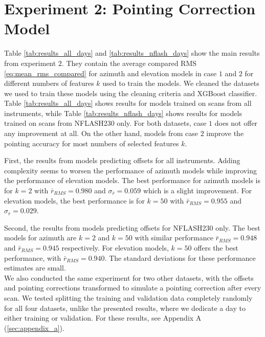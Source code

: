 \section{Experiment 2: Pointing Correction Model}
Table \ref{tab:results_all_days} and \ref{tab:results_nflash_days} show the main results from experiment $2$.
They contain the average compared RMS \eqref{eq:mean_rms_compared} for azimuth and elevation models in case $1$ and $2$ for different numbers of features $k$ used to train the models.
We cleaned the datasets we used to train these models using the cleaning criteria and XGBoost classifier.
Table \ref{tab:results_all_days} shows results for models trained on scans from all instruments, while Table \ref{tab:results_nflash_days} shows results for models
trained on scans from NFLASH230 only. For both datasets, case $1$ does not offer any improvement at all.
On the other hand, models from case $2$ improve the pointing accuracy for most numbers of selected features $k$.

First, the results from models predicting offsets for all instruments.
Adding complexity seems to worsen the performance of azimuth models while improving the performance of elevation models.
The best performance for azimuth models is for $k=2$ with $\bar{r}_{RMS}=0.980$ and $\sigma_{\bar{r}} = 0.059$ which is a slight improvement. 
For elevation models, the best performance is for $k=50$ with $\bar{r}_{RMS}=0.955$ and $\sigma_{\bar{r}} = 0.029$.

Second, the results from models predicting offsets for NFLASH230 only.
The best models for azimuth are $k=2$ and $k=50$ with similar performance $\bar{r}_{RMS}=0.948$ and $\bar{r}_{RMS}=0.945$ respectively.
For elevation models, $k=50$ offers the best performance, with $\bar{r}_{RMS}=0.940$.
The standard deviations for these performance estimates are small.\\


We also conducted the same experiment for two other datasets, with the offsets and pointing corrections transformed to simulate a pointing correction after every scan.
We tested splitting the training and validation data completely randomly for all four datasets, unlike the presented results, where we dedicate a day to either training or validation.
For these results, see Appendix A (\ref{sec:appendix_a}). 

